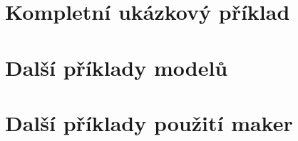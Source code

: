 \documentclass[thesis=M,czech]{FITthesis}[2012/06/26]
\newcommand{\acrlabel}[1]{acr:#1}
\newcommand{\acr}[1]{\acrshort{\acrlabel{#1}}}
\begin{document}

\appendix






\printglossary[type=\acronymtype, title=Seznam použitých symbolů a zkratek]


\chapter{Kompletní ukázkový příklad}


\chapter{Další příklady modelů}


\chapter{Další příklady použití maker}






\end{document}
